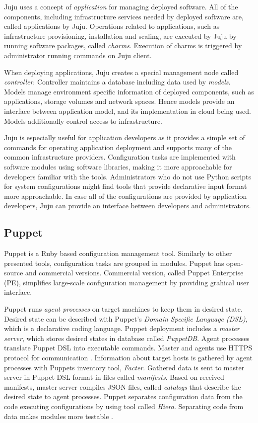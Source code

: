 Juju uses a concept of \textit{application} for managing deployed software. All
of the components, including infrastructure services needed by deployed
software are, called applications by Juju. Operations related to applications,
such as infrastructure provisioning, installation and scaling, are executed by
Juju by running software packages, called \textit{charms}. Execution of charms
is triggered by administrator running commands on Juju client.

When deploying applications, Juju creates a special management node called
\textit{controller}. Controller maintains a database including data used by
\textit{models}. Models manage environment specific information of deployed
components, such as applications, storage volumes and network spaces. Hence
models provide an interface between application model, and its implementation
in cloud being used. Models additionally control access to infrastructure.

Juju is especially useful for application developers as it provides a simple
set of commands for operating application deployment and supports many of the
common infrastructure providers. Configuration tasks are implemented with
software modules using software libraries, making it more approachable for
developers familiar with the tools. Administrators who do not use Python
scripts for system configurations might find tools that provide declarative
input format more approachable. In case all of the configurations are provided
by application developers, Juju can provide an interface between developers and
administrators.

\subsection{Puppet}

Puppet \cite{puppet} is a Ruby based configuration management tool. Similarly
to other presented tools, configuration tasks are grouped in modules. Puppet
has open-source and commercial versions. Commercial version, called Puppet
Enterprise (PE), simplifies large-scale configuration management by providing
grahical user interface.

Puppet runs \textit{agent processes} on target machines to keep them in desired
state. Desired state can be described with Puppet's \textit{Domain Specific
Language (DSL)}, which is a declarative coding language. Puppet deployment
includes a \textit{master server}, which stores desired states in database
called \textit{PuppetDB}. Agent processes translate Puppet DSL into executable
commands. Master and agents use HTTPS protocol for communication \cite{puppet}.
Information about target hosts is gathered by agent processes with Puppets
inventory tool, \textit{Facter}. Gathered data is sent to master server in
Puppet DSL format in files called \textit{manifests}. Based on received
manifests, master server compiles JSON files, called \textit{catalogs} that
describe the desired state to agent processes. Puppet separates configuration
data from the code executing configurations by using tool called
\textit{Hiera}. Separating code from data makes modules more testable
\cite{puppet}.

